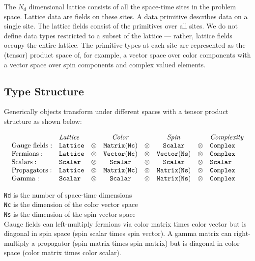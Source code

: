 \documentclass[12pt,letterpaper]{article}
\begin{document}
The $N_d$ dimensional lattice consists of all the space-time sites in
the problem space.  Lattice data are fields on these sites.  A data
primitive describes data on a single site.  The lattice fields consist
of the primitives over all sites.  We do not define data types
restricted to a subset of the lattice --- rather, lattice fields occupy
the entire lattice.
The primitive types at
each site are represented as the (tensor) product space of, for
example, a vector space over color components with a vector space over
spin components and complex valued elements.

\subsection{Type Structure}
\label{sec:typestructure}

Generically objects transform under different spaces with a tensor
product structure as shown below:

\begin{displaymath}
\begin{array}{llcccccl}
                  & {\it Lattice} &    &  {\it Color} &     & {\it Spin}  &     & {\it Complexity}\\
{\rm Gauge\ fields:}& {\tt Lattice} &\otimes& {\tt Matrix(Nc)}&\otimes& {\tt Scalar}    &\otimes& {\tt Complex}\\
{\rm Fermions:}    & {\tt Lattice} &\otimes& {\tt Vector(Nc)}&\otimes& {\tt Vector(Ns)}&\otimes& {\tt Complex}\\
{\rm Scalars:}     & {\tt Scalar}  &\otimes& {\tt Scalar}    &\otimes& {\tt Scalar}    &\otimes& {\tt Scalar} \\
{\rm Propagators:} & {\tt Lattice} &\otimes& {\tt Matrix(Nc)}&\otimes& {\tt Matrix(Ns)}&\otimes& {\tt Complex}\\
{\rm Gamma:}       & {\tt Scalar}  &\otimes& {\tt Scalar}    &\otimes& {\tt Matrix(Ns)}&\otimes& {\tt Complex}\\
\end{array}
\end{displaymath}

\noindent
\verb|Nd| is the number of space-time dimensions\\
\noindent
\verb|Nc| is the dimension of the color vector space\\
\noindent
\verb|Ns| is the dimension of the spin vector space\\

Gauge fields can left-multiply fermions via color matrix times color
vector but is diagonal in spin space (spin scalar times spin vector).
A gamma matrix can right-multiply a propagator (spin matrix times
spin matrix) but is diagonal in color space (color matrix times color
scalar).
\end{document}
